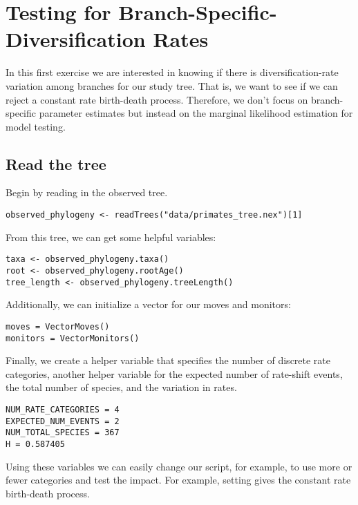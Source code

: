 \bigskip
\section{Testing for Branch-Specific-Diversification Rates}

In this first exercise we are interested in knowing if there is diversification-rate variation among branches for our study tree.
That is, we want to see if we can reject a constant rate birth-death process.
Therefore, we don't focus on branch-specific parameter estimates but instead on the marginal likelihood estimation for model testing.



\subsection{Read the tree}

Begin by reading in the observed tree.

{\tt \begin{snugshade*}
\begin{lstlisting}
observed_phylogeny <- readTrees("data/primates_tree.nex")[1]
\end{lstlisting}
\end{snugshade*}}

From this tree, we can get some helpful variables:
{\tt \begin{snugshade*}
\begin{lstlisting}
taxa <- observed_phylogeny.taxa()
root <- observed_phylogeny.rootAge()
tree_length <- observed_phylogeny.treeLength()
\end{lstlisting}
\end{snugshade*}}

Additionally, we can initialize a vector  for our moves and monitors:

{\tt \begin{snugshade*}
\begin{lstlisting}
moves = VectorMoves()
monitors = VectorMonitors()
\end{lstlisting}
\end{snugshade*}}

Finally, we create a helper variable that specifies the number of discrete rate categories, another helper variable for the expected number of rate-shift events, the total number of species, and the variation in rates.
{\tt \begin{snugshade*}
\begin{lstlisting}
NUM_RATE_CATEGORIES = 4
EXPECTED_NUM_EVENTS = 2
NUM_TOTAL_SPECIES = 367
H = 0.587405
\end{lstlisting}
\end{snugshade*}}
Using these variables we can easily change our script, for example, to use more or fewer categories and test the impact.
For example, setting  gives the constant rate birth-death process.

